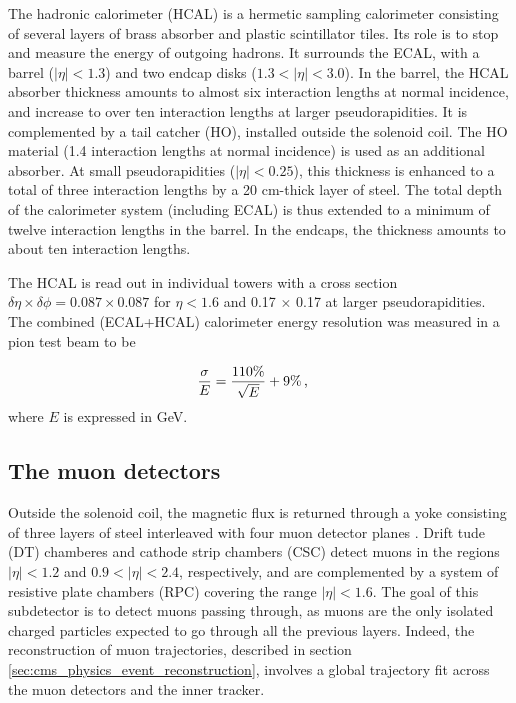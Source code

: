 The hadronic calorimeter (HCAL) \cite{CERN-LHCC-97-031} is a hermetic sampling calorimeter consisting of several layers of brass absorber and plastic scintillator tiles. Its role is to stop and measure the energy of outgoing hadrons. It surrounds the ECAL, with a barrel ($|\eta| < 1.3$) and two endcap disks ($1.3 < |\eta| < 3.0$). In the barrel, the HCAL absorber thickness amounts to almost six interaction lengths at normal incidence, and increase to over ten interaction lengths at larger pseudorapidities. It is complemented by a tail catcher (HO), installed outside the solenoid coil. The HO material (1.4 interaction lengths at normal incidence) is used as an additional absorber. At small pseudorapidities ($|\eta| < 0.25$), this thickness is enhanced to a total of three interaction lengths by a 20 cm-thick layer of steel. The total depth of the calorimeter system (including ECAL) is thus extended to a minimum of twelve interaction lengths in the barrel. In the endcaps, the thickness amounts to about ten interaction lengths.

The HCAL is read out in individual towers with a cross section $\delta\eta \times \delta\phi = 0.087 \times 0.087$ for $\eta < 1.6$ and 0.17 $\times$ 0.17 at larger pseudorapidities. The combined (ECAL+HCAL) calorimeter energy resolution was measured in a pion test beam to be 

\begin{equation}
    \frac{\sigma}{E} = \frac{110 \%}{\sqrt{E}} + 9\% \msep
\end{equation}
where $E$ is expressed in GeV.
\subsection{The muon detectors}

Outside the solenoid coil, the magnetic flux is returned through a yoke consisting of three layers of steel interleaved with four muon detector planes \cite{CERN-LHCC-97-032,collaboration_2013}. Drift tude (DT) chamberes and cathode strip chambers (CSC) detect muons in the regions $|\eta| < 1.2$ and $0.9 < |\eta| < 2.4$, respectively, and are complemented by a system of resistive plate chambers (RPC) covering the range $|\eta| < 1.6$. The goal of this subdetector is to detect muons passing through, as muons are the only isolated charged particles expected to go through all the previous layers. Indeed, the reconstruction of muon trajectories, described in section \ref{sec:cms_physics_event_reconstruction}, involves a global trajectory fit across the muon detectors and the inner tracker.

